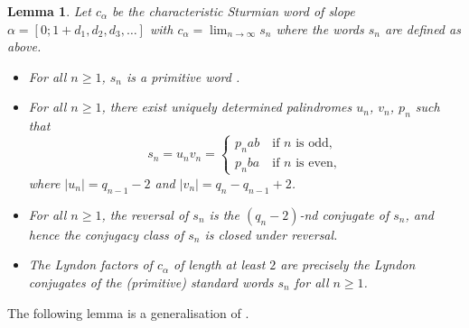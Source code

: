 \documentclass[11pt]{amsart}
\newcommand{\1}{\bar{1}}
\theoremstyle{plain}
\newtheorem{lemma}[theorem]{Lemma}
\theoremstyle{definition}
\theoremstyle{remark}
\begin{document}
\begin{lemma} \label{L:s_n} Let $c_\alpha$ be the characteristic Sturmian word of slope $\alpha = [0; 1+d_1, d_2, d_3, \ldots]$ with $c_\alpha = \displaystyle \lim_{n\to\infty}s_n$ where the words $s_n$ are defined as above.
\begin{itemize}
\item For all $n \geq 1$, $s_n$ is a primitive word \cite{aDfM94some}.
\item For all $n \geq 1$, there exist uniquely determined palindromes $u_n$, $v_n$, $p_n$ such that
\[
s_n = u_nv_n = \begin{cases} p_nab \quad \mbox{if $n$ is odd}, \\
p_nba \quad \mbox{if $n$ is even},
\end{cases}
\]
where $|u_n| = q_{n-1} - 2$ and $|v_{n}| = q_n - q_{n-1} + 2$. \cite{aDfM94some}
\item For all $n \geq 1$, the reversal of $s_n$ is the $(q_n - 2)$-nd conjugate of $s_n$, and hence the conjugacy class of $s_n$ is closed under reversal. \cite[Prop.~2.9(4)]{aG06onst}
\item The Lyndon factors of $c_\alpha$ of length at least $2$ are precisely the Lyndon conjugates of the (primitive) standard words $s_n$ for all $n \geq 1$.%
\cite{jBaD97stur,aD97stur} %
\end{itemize}
\end{lemma}

The following lemma is a generalisation of \cite[Lemma 8]{kS14lynd}.
\end{document}
